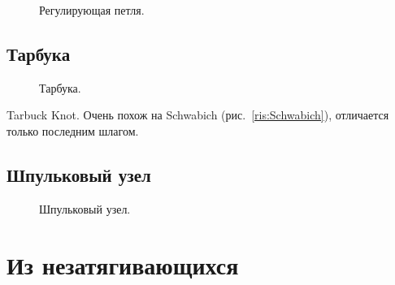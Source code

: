 \begin{figure}[H]\centering
	\begin{minipage}{1\linewidth}
		\begin{center}
			\tcbox[enhanced jigsaw,colframe=black,opacityframe=0.5,opacityback=0.5]
			{\centering{}}
		\end{center}
	\end{minipage}
\caption{Регулирующая петля.}
\label{ris:Reguliruemaya_loop}
\end{figure}

\subsection{Тарбука}

\begin{figure}[H]\centering
	\begin{minipage}{1\linewidth}
		\begin{center}
			\tcbox[enhanced jigsaw,colframe=black,opacityframe=0.5,opacityback=0.5]
			{\centering{}}
		\end{center}
	\end{minipage}
\caption{Тарбука.}
\label{ris:Tarbuck_Knot}
\end{figure}

Tarbuck Knot. Очень похож на Schwabich (рис.~\ref{ris:Schwabich}), отличается только последним шлагом.

\subsection{Шпульковый узел}

\begin{figure}[H]\centering
	\begin{minipage}{1\linewidth}
		\begin{center}
			\tcbox[enhanced jigsaw,colframe=black,opacityframe=0.5,opacityback=0.5]
			{\centering{}}
		\end{center}
	\end{minipage}
\caption{Шпульковый узел.}
\label{ris:Shpulkovy}
\end{figure}

\section{Из незатягивающихся}\label{iz_nonslide}

